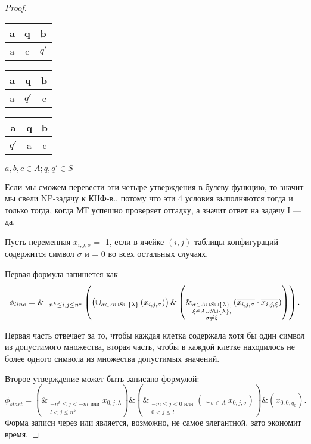 \begin{proof}
\begin{enumerate}
\begin{table}[h!]
\centering
\begin{tabular}{|c|c|c|}
\hline a&q&b\\
\hline a&c&$q'$\\
\hline
\end{tabular}
\end{table}
\begin{table}[h!]
\centering
\begin{tabular}{|c|c|c|}
\hline a&q&b\\
\hline a&$q'$&c\\
\hline
\end{tabular}
\end{table}
\begin{table}[h!]
\centering
\begin{tabular}{|c|c|c|}
\hline a&q&b\\
\hline $q'$&a&c\\
\hline
\end{tabular}
\end{table}

$a, b, c \in A; q, q' \in S$

\end{enumerate}
Если мы сможем перевести эти четыре утверждения в булеву функцию, то значит мы
свели NP-задачу к КНФ-в., потому что эти 4 условия выполняются тогда и только
тогда, когда МТ успешно проверяет отгадку, а значит ответ на задачу I --- да.

Пусть переменная $x_{i,j,\sigma} =$ 1, если в ячейке  $(i,j)$ таблицы
конфигураций содержится символ  $\sigma$ и = 0 во всех остальных случаях.

Первая формула запишется как \[
	\phi_{line} = \&_{-n^k\le i, j\le n^k} \left( \left( \cup_{\sigma \in A\cup S \cup
	\{\lambda \} } \left( x_{i,j,\sigma}  \right)  \right)\&
	\\
	\left(
	\&_{\substack{\sigma\in A\cup S \cup
	\{\lambda \}
	, \\
\xi\in A\cup S \cup \{\lambda \},\\
\sigma \neq \xi
	}} \left( \overline{x_{i,j,\sigma}} \cdot \overline{x_{i,j,\xi}} \right)
\right) \right)
.\] 

Первая часть отвечает за то, чтобы каждая клетка содержала хотя бы один символ
из допустимого множества, вторая часть, чтобы в каждой клетке находилось не
более одного символа из множества допустимых значений.

Второе утверждение может быть записано формулой:
\[
	\phi_{start} = \left( \&_{\substack{-n^k\le j < -m \text{ или} \\ l<j\le n^k}} x_{0,j,\lambda} \right) \& 
	\left( \&_{\substack{-m\le  j < 0 \text{ или}\\ 0<j\le l}}
	\left(\cup_{\sigma \in A} x_{0,j,\sigma}\right) \right) \& 
	\left( x_{0,0,q_0} \right) 
.\] 
Форма записи через или является, возможно, не самое элегантной, зато экономит
время.


\end{proof}
